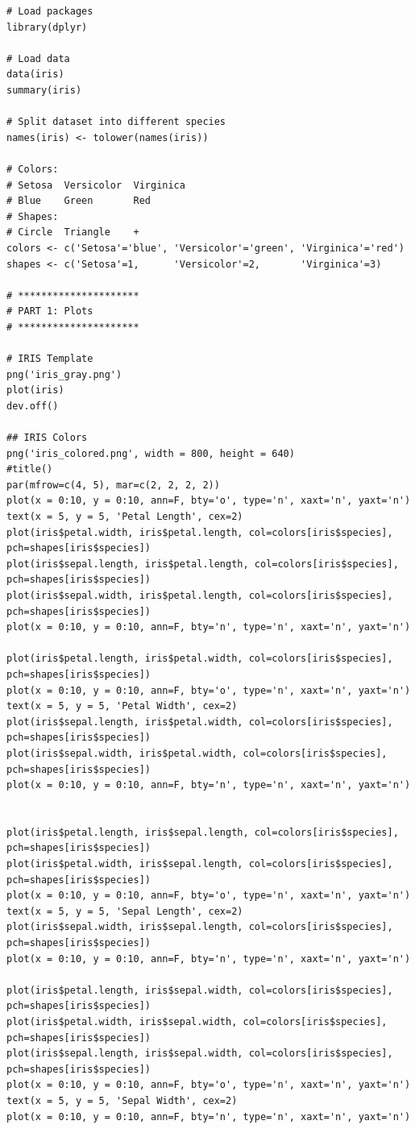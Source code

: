 \documentclass{article}
\begin{document}
\begin{lstlisting}[style=R]
# Load packages
library(dplyr)

# Load data
data(iris)
summary(iris)

# Split dataset into different species
names(iris) <- tolower(names(iris))

# Colors:
# Setosa  Versicolor  Virginica
# Blue    Green       Red
# Shapes:
# Circle  Triangle    +
colors <- c('Setosa'='blue', 'Versicolor'='green', 'Virginica'='red')
shapes <- c('Setosa'=1,      'Versicolor'=2,       'Virginica'=3)

# *********************
# PART 1: Plots
# *********************

# IRIS Template
png('iris_gray.png')
plot(iris)
dev.off()

## IRIS Colors
png('iris_colored.png', width = 800, height = 640)
#title()
par(mfrow=c(4, 5), mar=c(2, 2, 2, 2))
plot(x = 0:10, y = 0:10, ann=F, bty='o', type='n', xaxt='n', yaxt='n')
text(x = 5, y = 5, 'Petal Length', cex=2)
plot(iris$petal.width, iris$petal.length, col=colors[iris$species], pch=shapes[iris$species])
plot(iris$sepal.length, iris$petal.length, col=colors[iris$species], pch=shapes[iris$species])
plot(iris$sepal.width, iris$petal.length, col=colors[iris$species], pch=shapes[iris$species])
plot(x = 0:10, y = 0:10, ann=F, bty='n', type='n', xaxt='n', yaxt='n')

plot(iris$petal.length, iris$petal.width, col=colors[iris$species], pch=shapes[iris$species])
plot(x = 0:10, y = 0:10, ann=F, bty='o', type='n', xaxt='n', yaxt='n')
text(x = 5, y = 5, 'Petal Width', cex=2)
plot(iris$sepal.length, iris$petal.width, col=colors[iris$species], pch=shapes[iris$species])
plot(iris$sepal.width, iris$petal.width, col=colors[iris$species], pch=shapes[iris$species])
plot(x = 0:10, y = 0:10, ann=F, bty='n', type='n', xaxt='n', yaxt='n')


plot(iris$petal.length, iris$sepal.length, col=colors[iris$species], pch=shapes[iris$species])
plot(iris$petal.width, iris$sepal.length, col=colors[iris$species], pch=shapes[iris$species])
plot(x = 0:10, y = 0:10, ann=F, bty='o', type='n', xaxt='n', yaxt='n')
text(x = 5, y = 5, 'Sepal Length', cex=2)
plot(iris$sepal.width, iris$sepal.length, col=colors[iris$species], pch=shapes[iris$species])
plot(x = 0:10, y = 0:10, ann=F, bty='n', type='n', xaxt='n', yaxt='n')

plot(iris$petal.length, iris$sepal.width, col=colors[iris$species], pch=shapes[iris$species])
plot(iris$petal.width, iris$sepal.width, col=colors[iris$species], pch=shapes[iris$species])
plot(iris$sepal.length, iris$sepal.width, col=colors[iris$species], pch=shapes[iris$species])
plot(x = 0:10, y = 0:10, ann=F, bty='o', type='n', xaxt='n', yaxt='n')
text(x = 5, y = 5, 'Sepal Width', cex=2)
plot(x = 0:10, y = 0:10, ann=F, bty='n', type='n', xaxt='n', yaxt='n')


\end{lstlisting}
\end{document}
